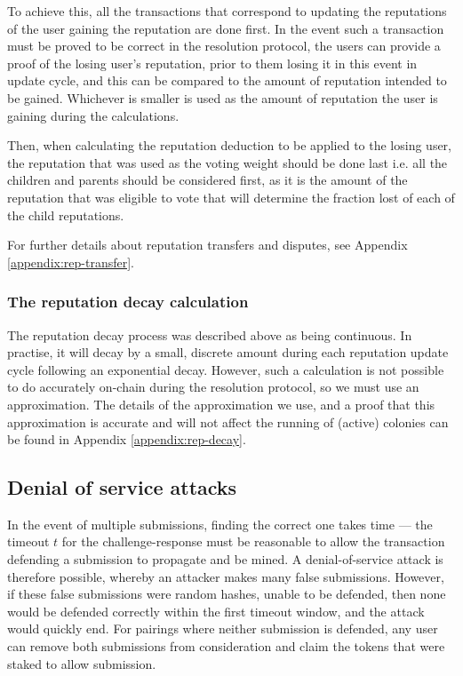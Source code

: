 To achieve this, all the transactions that correspond to updating the reputations of the user gaining the reputation are done first. In the event such a transaction must be proved to be correct in the resolution protocol, the users can provide a proof of the losing user's reputation, prior to them losing it in this event in update cycle, and this can be compared to the amount of reputation intended to be gained. Whichever is smaller is used as the amount of reputation the user is gaining during the calculations.

Then, when calculating the reputation deduction to be applied to the losing user, the reputation that was used as the voting weight should be done last i.e. all the children and parents should be considered first, as it is the amount of the reputation that was eligible to vote that will determine the fraction lost of each of the child reputations. %

For further details about reputation transfers and disputes, see Appendix \ref{appendix:rep-transfer}.

\subsubsection{The reputation decay calculation}\label{sec:repdecay}
The reputation decay process was described above as being continuous. In practise, it will decay by a small, discrete amount during each reputation update cycle following an exponential decay. However, such a calculation is not possible to do accurately on-chain during the resolution protocol, so we must use an approximation. The details of the approximation we use, and a proof that this approximation is accurate and will not affect the running of (active) colonies can be found in Appendix \ref{appendix:rep-decay}.

\subsection{Denial of service attacks}\label{sec:mining-possible-attacks}

In the event of multiple submissions, finding the correct one takes time --- the timeout $t$ for the challenge-response must be reasonable to allow the transaction defending a submission to propagate and be mined. A denial-of-service attack is therefore possible, whereby an attacker makes many false submissions. However, if these false submissions were random hashes, unable to be defended, then none would be defended correctly within the first timeout window, and the attack would quickly end. For pairings where neither submission is defended, any user can remove both submissions from consideration and claim the tokens that were staked to allow submission.


